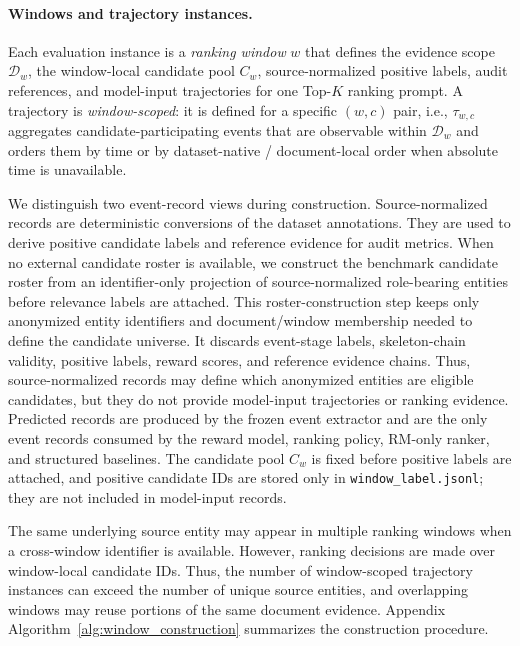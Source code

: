 \documentclass{article}
\begin{document}
\paragraph{Windows and trajectory instances.}
Each evaluation instance is a \emph{ranking window} $w$ that defines the evidence scope $\mathcal{D}_w$, the window-local candidate pool $C_w$, source-normalized positive labels, audit references, and model-input trajectories for one Top-$K$ ranking prompt.
A trajectory is \emph{window-scoped}: it is defined for a specific $(w,c)$ pair, i.e., $\tau_{w,c}$ aggregates candidate-participating events that are observable within $\mathcal{D}_w$ and orders them by time or by dataset-native / document-local order when absolute time is unavailable.

We distinguish two event-record views during construction.
Source-normalized records are deterministic conversions of the dataset annotations.
They are used to derive positive candidate labels and reference evidence for audit metrics.
When no external candidate roster is available, we construct the benchmark candidate roster from an identifier-only projection of source-normalized role-bearing entities before relevance labels are attached.
This roster-construction step keeps only anonymized entity identifiers and document/window membership needed to define the candidate universe.
It discards event-stage labels, skeleton-chain validity, positive labels, reward scores, and reference evidence chains.
Thus, source-normalized records may define which anonymized entities are eligible candidates, but they do not provide model-input trajectories or ranking evidence.
Predicted records are produced by the frozen event extractor and are the only event records consumed by the reward model, ranking policy, RM-only ranker, and structured baselines.
The candidate pool $C_w$ is fixed before positive labels are attached, and positive candidate IDs are stored only in \texttt{window\_label.jsonl}; they are not included in model-input records.

The same underlying source entity may appear in multiple ranking windows when a cross-window identifier is available.
However, ranking decisions are made over window-local candidate IDs.
Thus, the number of window-scoped trajectory instances can exceed the number of unique source entities, and overlapping windows may reuse portions of the same document evidence.
Appendix Algorithm~\ref{alg:window_construction} summarizes the construction procedure.
\end{document}
